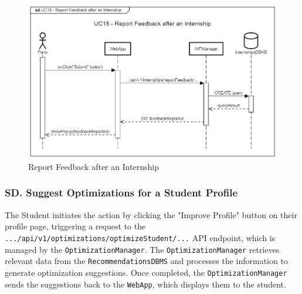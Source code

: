 \begin{figure}[H]
    \begin{center}
         \includegraphics[width=1\linewidth]{LaTeXCode/images/SequenceDiagrams/UC18-sequenceDiagram.png}
         \caption{Report Feedback after an Internship}
         \label{fig:report_feedback_sd}
     \end{center}
\end{figure}

\newpage

\subsubsection*{SD\cuc. Suggest Optimizations for a Student Profile}
\label{subsubsec:suggest_optimizations_student_sd}
The Student initiates the action by clicking the "Improve Profile" button on their profile page, triggering a request to the \texttt{.../api/v1/optimizations/optimizeStudent/...} API endpoint, which is managed by the \texttt{OptimizationManager}. The \texttt{OptimizationManager} retrieves relevant data from the \texttt{RecommendationsDBMS} and processes the information to generate optimization suggestions. Once completed, the \texttt{OptimizationManager} sends the suggestions back to the \texttt{WebApp}, which displays them to the student.

